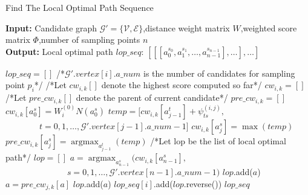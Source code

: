 \documentclass[a4paper,12pt]{article}
\begin{document}
 
\begin{CJK}{UTF8}{gbsn} 
\begin{algorithm} 
    \setcounter{algorithm}{0}
    \caption{Find The Local Optimal Path Sequence} 
    \hspace*{0.02in} {\bf Input:} Candidate graph $\mathcal{G}'=\{\mathcal{V},\mathcal{E}\}$,distance weight matrix $W$,weighted score matrix $\Phi$,number of sampling points $n$ \\ 
    \hspace*{0.02in} {\bf Output:} Local optimal path $lop\_seq$: $[[[a_0^{s_0},a_1^{s_1},\dots,a_{n-1}^{s_{n-1}}],\dots],\dots]$
    \begin{algorithmic}[1]
    \iffalse
    \fi
	\State $lop\_seq=[]$
            \State /*$\mathcal{G}'.vertex[i].a\_num$ is the number of candidates for sampling point $p_i$*/
				\State /*Let $cw_{i,k}[]$ denote the highest score computed so far*/ 
				\State $cw_{i,k} = []$ 
				\State /*Let $pre\_cw_{i,k}[]$ denote the parent of current candidate*/ 
				\State $pre\_cw_{i,k} = []$ 
					\State $cw_{i,k}[a_0^s] = W_i^{(0)}N(a_0^s)$
				\EndFor
						\State $temp=[cw_{i,k}[a_{j-1}^t]+\psi_{ts}^{(i,j)},$
						\State $\qquad \quad \quad t=0,1,\dots,\mathcal{G}'.vertex[j-1].a\_num-1]$
						\State $cw_{i,k}[a_{j}^s] = \max{(temp)}$
						\State $pre\_cw_{i,k}[a_j^s] = \mathop{\mathrm{argmax}}_{a_{j-1}^t}{(temp)}
$
					\EndFor
				\EndFor
				\State /*Let lop be the list of local optimal path*/
				\State $lop = []$
				\State $a = \mathop{\mathrm{argmax}}_{a_{n-1}^s}{(cw_{i,k}[a_{n-1}^s],}$
				\State $\qquad \qquad \qquad \quad \; s=0,1,\dots,\mathcal{G}'.vertex[n-1].a\_num-1)$
					\State $lop$.add($a$)
					\State $a = pre\_cw_{j,k}[a]$
				\EndFor
				\State $lop$.add($a$)
				\State $lop\_seq[i]$.add($lop$.reverse())
			\EndFor
        \EndFor
	\State \Return $lop\_seq$
    \end{algorithmic} 
\end{algorithm}
\end{CJK} 
\end{document}
